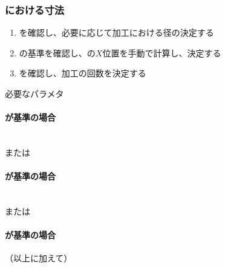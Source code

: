 \clearpage
\subsubsection{\KeywayMilling における寸法}
\begin{enumerate}[label=\sarrow]
\item \KeywayType を確認し、必要に応じて加工における径の決定する
\item {}\nameKeywayCenter の基準を確認し、\KeywayCenter の$X$位置を手動で計算し、決定する
\item \KeywayWidth を確認し、加工の回数を決定する
\end{enumerate}
\begin{Parameter}{必要なパラメタ}
\paragraph*{\CenterCurvatureLine が基準の場合}
\PMKeywayACOD
\PMKeywayBDOD
\PMKeywayPos
\PMKeywayWidth
\PMCenterCurvatureRadius\\
\PMKeywayCornerR または\PMKeywayCornerC
\tcbline*
\paragraph*{\OutcutCenter が基準の場合}
\PMKeywayACOD
\PMKeywayBDOD
\PMKeywayPos
\PMKeywayWidth\\
\PMKeywayCornerR または\PMKeywayCornerC
\tcbline*
\paragraph*{\AsideKeywayDepth が基準の場合}
（以上に加えて）\PMAsideKeywayDepth
\end{Parameter}

\clearpage
